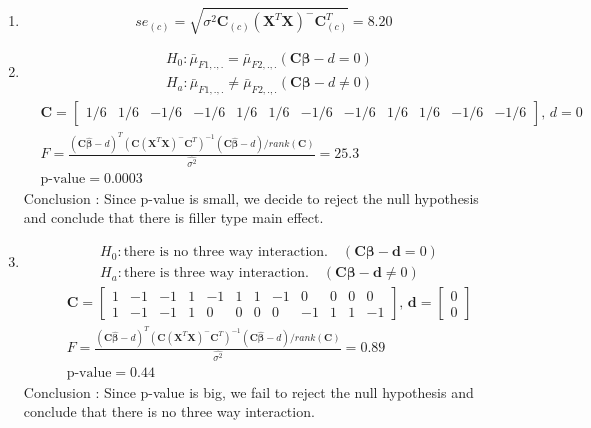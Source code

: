 \documentclass{article}
\begin{document}
\begin{enumerate}[leftmargin = 0 em, label = \arabic*., font = \bfseries]
\begin{enumerate}
		\item 
		\[se_{(c)} = \sqrt{\hat{\sigma^2} \bm C_{(c)} (\bm X^T \bm X)^- \bm C_{(c)}^T} = 8.20\]

		\item 
		\begin{align*}
		&H_0 : \bar{\mu}_{F1,.,.} = \bar{\mu}_{F2,.,.} (\bm C \bm \beta - d = 0)\\
		&H_a : \bar{\mu}_{F1,.,.} \neq \bar{\mu}_{F2,.,.} (\bm C \bm \beta -d \neq 0)
		\end{align*}
		\begin{align*}
		& \bm C = \begin{bmatrix}
			1/6&1/6&-1/6&-1/6&1/6&1/6&-1/6&-1/6&1/6&1/6&-1/6&-1/6
		\end{bmatrix},\, d = 0\\
		&  F = \frac{(\bm C \hat{\bm \beta} - d)^T (\bm C (\bm X^T \bm X)^-\bm C^T)^{-1} (\bm C \bm \hat{\bm\beta} - d)/rank(\bm C)}{\hat{\sigma^2}} = 25.3\\
		& \textrm{p-value} = 0.0003
		\end{align*}
		Conclusion : Since p-value is small, we decide to reject the null hypothesis and conclude that there is filler type main effect.

		\item 
		\begin{align*}
		&H_0 : \textrm{there is no three way interaction.} \quad (\bm C \bm \beta - \bm d = 0)\\
		&H_a : \textrm{there is three way interaction.} \quad (\bm C \bm \beta -\bm d \neq 0)
		\end{align*}
		\begin{align*}
		& \bm C = \begin{bmatrix}
			1&-1&-1&1&-1&1&1&-1&0&0&0&0\\
			1&-1&-1&1&0&0&0&0&-1&1&1&-1
		\end{bmatrix},\, \bm d = \begin{bmatrix}
			0\\0
		\end{bmatrix}\\
		&  F = \frac{(\bm C \hat{\bm \beta} - d)^T (\bm C (\bm X^T \bm X)^-\bm C^T)^{-1} (\bm C \bm \hat{\bm\beta} - d)/rank(\bm C)}{\hat{\sigma^2}} = 0.89\\
		& \textrm{p-value} = 0.44
		\end{align*}
		Conclusion : Since p-value is big, we fail to reject the null hypothesis and conclude that there is no three way interaction.
		
		


	\end{enumerate}
	
	


 	\end{enumerate}


	
	
	
	
\end{document}
